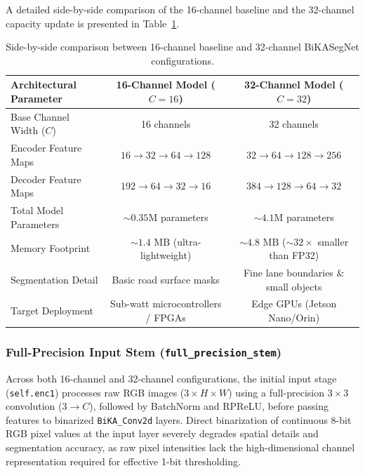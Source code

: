 \documentclass[a4paper]{report}
\begin{document}
A detailed side-by-side comparison of the 16-channel baseline and the 32-channel capacity update is presented in Table~\ref{tab:bika_channel_comparison}.

\begin{table}[htbp]
\centering
\caption{Side-by-side comparison between 16-channel baseline and 32-channel BiKASegNet configurations.}
\label{tab:bika_channel_comparison}
\small
\begin{tabular}{lcc}
\hline
\textbf{Architectural Parameter} & \textbf{16-Channel Model ($C = 16$)} & \textbf{32-Channel Model ($C = 32$)} \\ \hline
Base Channel Width ($C$) & 16 channels & 32 channels \\
Encoder Feature Maps & $16 \rightarrow 32 \rightarrow 64 \rightarrow 128$ & $32 \rightarrow 64 \rightarrow 128 \rightarrow 256$ \\
Decoder Feature Maps & $192 \rightarrow 64 \rightarrow 32 \rightarrow 16$ & $384 \rightarrow 128 \rightarrow 64 \rightarrow 32$ \\
Total Model Parameters & $\sim 0.35\text{M}$ parameters & $\sim 4.1\text{M}$ parameters \\
Memory Footprint & $\sim 1.4\text{ MB}$ (ultra-lightweight) & $\sim 4.8\text{ MB}$ ($\sim 32\times$ smaller than FP32) \\
Segmentation Detail & Basic road surface masks & Fine lane boundaries \& small objects \\
Target Deployment & Sub-watt microcontrollers / FPGAs & Edge GPUs (Jetson Nano/Orin) \\ \hline
\end{tabular}
\end{table}

\subsubsection{Full-Precision Input Stem (\texttt{full\_precision\_stem})}
Across both 16-channel and 32-channel configurations, the initial input stage (\texttt{self.enc1}) processes raw RGB images ($3 \times H \times W$) using a full-precision $3\times3$ convolution ($3 \rightarrow C$), followed by BatchNorm and RPReLU, before passing features to binarized \texttt{BiKA\_Conv2d} layers. Direct binarization of continuous 8-bit RGB pixel values at the input layer severely degrades spatial details and segmentation accuracy, as raw pixel intensities lack the high-dimensional channel representation required for effective 1-bit thresholding.
\end{document}

